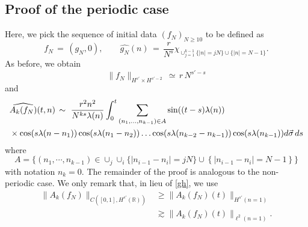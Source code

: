 \documentclass{amsart}
\begin{document}
\subsection{Proof of the periodic case} Here, we pick the sequence of initial data $(f_N)_{N\geq 10}$ to be defined as
\begin{equation}
  f_N\,=\,(g_N, 0), \qquad \widehat{g_N}(n)\,=\,\frac{r}{N^s} \chi_{\cup_{j=1}^{k-1}\{| n | = jN\}\cup \{| n | = N-1\} }.
\label{fnp}
\end{equation}
As before, we obtain
\[
\|f_N\|_{H^{s'}\times H^{s'-2}}\,\simeq\,r\,N^{s'-s}
\]
and
\begin{equation}
  \aligned
& \widehat{A_{k}(f_N)}(t,n)\,\sim\
\frac{r^2 n^2}{N^{ks}\lambda(n)}\int_0^t 
\sum_{(n_{1}, \ldots, n_{k-1}) \in A}
\sin((t-s) \lambda(n))
\\
& \times \cos(s \lambda(n- n_{1}))
\cos(s \lambda(n_{1}- n_{2}))\dots
\cos(s\lambda(n_{k-2} - n_{k-1}))
\cos(s\lambda(n_{k-1}))d \vec{\sigma}\,ds
\endaligned
\end{equation}
where 
\[
  A = \{ (n_{1}, \cdots, n_{k-1}) \in \cup_{j} \cup_{i}\{|n_{i-1}-n_{i}| =  jN\} \cup \left \{ | n_{i-1} - n_{i} | = N-1 \right \} \}
\]
with notation $n_{k} = 0$.
The remainder of the proof is analogous to the non-periodic case. We only remark that, in lieu of \eqref{gh}, we use
\begin{equation}
  \begin{split}
\|A_{k}(f_N)\|_{C([0,1], H^{s'}(\mathbb{R}))} &\geq \|A_{k}(f_N)(t)\|_{H^{s'}(n = 1)}\\ &\gtrsim \|A_{k}(f_N)(t)\|_{\ell^2(n=1)}.
\end{split}
\end{equation}



\end{document}
